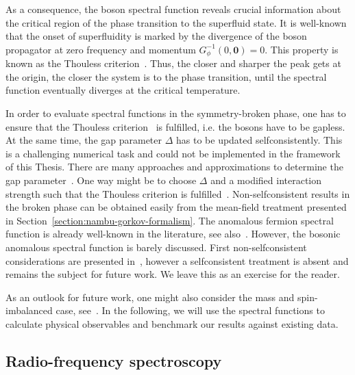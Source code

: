 As a consequence, the boson spectral function reveals crucial information about the critical region of the phase transition to the superfluid state. It is well-known that the onset of superfluidity is marked by the divergence of the boson propagator at zero frequency and momentum $G^{-1}_{\phi}(0,\bm{0})=0$. This property is known as the Thouless criterion~\cite{Thouless1960}. Thus, the closer and sharper the peak gets at the origin, the closer the system is to the phase transition, until the spectral function eventually diverges at the critical temperature.

\newpage

In order to evaluate spectral functions in the symmetry-broken phase, one has to ensure that the Thouless criterion~\cite{Thouless1960} is fulfilled, i.e. the bosons have to be gapless. At the same time, the gap parameter $\Delta$ has to be updated selfconsistently. This is a challenging numerical task and could not be implemented in the framework of this Thesis. There are many approaches and approximations to determine the gap parameter~\cite{Haussmann2009,Perali2004}. One way might be to choose $\Delta$ and a modified interaction strength such that the Thouless criterion is fulfilled~\cite{Haussmann2009,Lang2023}. Non-selfconsistent results in the broken phase can be obtained easily from the mean-field treatment presented in Section~\ref{section:nambu-gorkov-formalism}. The anomalous fermion spectral function is already well-known in the literature, see also~\cite{Bzdusek2013}. However, the bosonic anomalous spectral function is barely discussed. First non-selfconsistent considerations are presented in~\cite{Pieri2004-1}, however a selfconsistent treatment is absent and remains the subject for future work. We leave this as an exercise for the reader.

As an outlook for future work, one might also consider the mass and spin-imbalanced case, see~\cite{Punk2007,Punk2010,Frank2018}. In the following, we will use the spectral functions to calculate physical observables and benchmark our results against existing data.


\newpage


\subsection*{Radio-frequency spectroscopy}
\label{section:rf-spectra}

